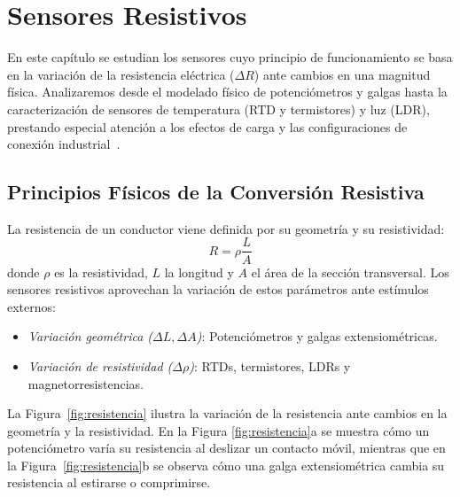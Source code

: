 
\chapter{Sensores Resistivos}\label{cap:resistivos}

En este capítulo se estudian los sensores cuyo principio de funcionamiento se basa en la variación de la resistencia eléctrica ($\Delta R$) ante cambios en una magnitud física. Analizaremos desde el modelado físico de potenciómetros y galgas hasta la caracterización de sensores de temperatura (RTD y termistores) y luz (LDR), prestando especial atención a los efectos de carga y las configuraciones de conexión industrial~\cite{pallasareny2000sensors}.

\section{Principios Físicos de la Conversión Resistiva}\label{sec:fundamentos_resistivos}

La resistencia de un conductor viene definida por su geometría y su resistividad:
\begin{equation}
    R = \rho \frac{L}{A}
\end{equation}
donde $\rho$ es la resistividad, $L$ la longitud y $A$ el área de la sección transversal. Los sensores resistivos aprovechan la variación de estos parámetros ante estímulos externos:
\begin{itemize}
    \item \emph{Variación geométrica ($\Delta L, \Delta A$)}: Potenciómetros y galgas extensiométricas.
    \item \emph{Variación de resistividad ($\Delta \rho$)}: RTDs, termistores, LDRs y magnetorresistencias.
\end{itemize}
La Figura~\ref{fig:resistencia} ilustra la variación de la resistencia ante cambios en la geometría y la resistividad. En la Figura \ref{fig:resistencia}a se muestra cómo un potenciómetro varía su resistencia al deslizar un contacto móvil, mientras que en la Figura~\ref{fig:resistencia}b se observa cómo una galga extensiométrica cambia su resistencia al estirarse o comprimirse.

